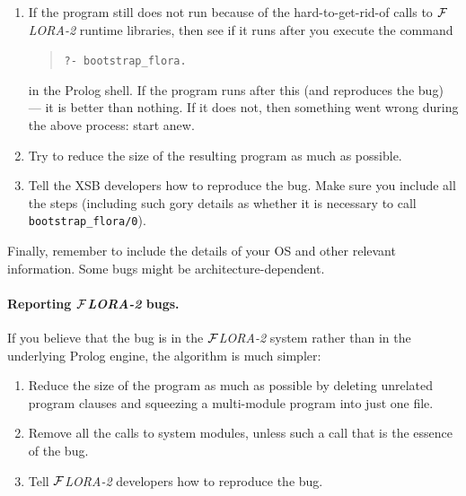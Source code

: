 \documentclass[11pt]{article}
\newcommand{\FLORA}{{\mbox{${\cal F}${\small\it LORA}\rm\emph{-2}}}\xspace}
\begin{document}
\begin{enumerate}
    Other calls that are often no longer needed in the dumped code are
    those that load \FLORA runtime libraries (which we are trying to
    eliminate!). These calls have the form
    \begin{verbatim}
    ?- flora_load_library(...).      
    \end{verbatim}
    If there are other calls to \FLORA runtime libraries, try to delete
    them, but make sure that the bug is still reproducible.
  \item If the program still does not run because of the hard-to-get-rid-of
    calls to \FLORA runtime libraries, then see if it runs after you
    execute the command
    \begin{quote}
       {\tt ?- bootstrap\_flora.}      
    \end{quote}
    in the Prolog shell. If the program runs after this (and reproduces the
    bug) --- it is better than nothing. If it does not, then something went
    wrong during the above process: start anew.
  \item Try to reduce the size of the resulting program as much as possible.
  \item Tell the XSB developers how to reproduce the bug. Make sure you
    include all the steps (including such gory details as whether it is
    necessary to call {\tt bootstrap\_flora/0}).
\end{enumerate}
Finally, remember to include the details of your OS and other relevant
information. Some bugs might be architecture-dependent.

\paragraph{Reporting \FLORA bugs.}
If you believe that the bug is in the \FLORA system rather than in the
underlying Prolog engine, the algorithm is much simpler: 
\begin{enumerate}
  \item Reduce the size of the program as much as possible by deleting 
    unrelated program clauses and squeezing a multi-module program into
    just one file.
  \item Remove all the calls to system modules, unless such a call that is
    the essence of the bug.
  \item Tell \FLORA developers how to reproduce the bug.
\end{enumerate}
\end{document}
